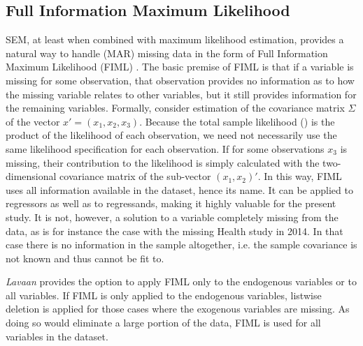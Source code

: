 \subsection{Full Information Maximum Likelihood}
\label{sec:methods:fiml}
SEM, at least when combined with maximum likelihood estimation, provides a natural way to handle (MAR) missing data in the
form of Full Information Maximum Likelihood (FIML) \cite{arbuckle2013full}.
The basic premise of FIML is that if a variable is missing for some observation, that observation provides no information
as to how the missing variable relates to other variables, but it still provides information for the remaining variables.
Formally, consider estimation of the covariance matrix $\Sigma$ of the vector $x' = (x_1, x_2, x_3)$.
Because the total sample likelihood () is the product of the likelihood of each observation,
we need not necessarily use the same likelihood specification for each observation.
If for some observations $x_3$ is missing, their contribution to the likelihood is simply calculated with the two-dimensional
covariance matrix of the sub-vector $(x_1, x_2)'$.
In this way, FIML uses all information available in the dataset, hence its name. It can be applied to regressors
as well as to regressands, making it highly valuable for the present study.
It is not, however, a solution to a variable completely missing from the data, as is for instance the case with the
missing Health study in 2014. In that case there is no information in the sample altogether, i.e. the sample covariance
is not known and thus cannot be fit to.

\textit{Lavaan} provides the option to apply FIML only to the endogenous variables or to all variables.
If FIML is only applied to the endogenous variables, listwise deletion is applied for those cases where the exogenous
variables are missing. As doing so would eliminate a large portion of the data, FIML is used for all variables in the dataset.

